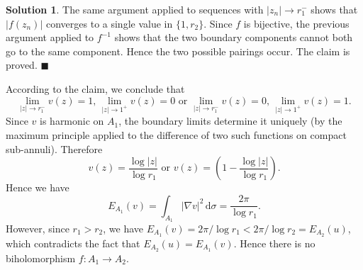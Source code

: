 \documentclass{article}
\theoremstyle{definition}
\newtheorem{solution}{Solution}
\newcommand{\dd}{\mathrm{d}}
\begin{document}
\begin{solution}
The same argument applied to sequences with $|z_n|\to r_1^-$ shows that $|f(z_n)|$ converges to a single value in $\{1,r_2\}$. Since $f$ is bijective, the previous argument applied to $f^{-1}$ shows that the two boundary components cannot both go to the same component. Hence the two possible pairings occur. The claim is proved. $\blacksquare$
    
    According to the claim, we conclude that 
    \[ \lim_{|z|\to r_1^-}v(z)=1,\,\lim_{|z|\to 1^+}v(z)=0 \text{ or } \lim_{|z|\to r_1^-}v(z)=0,\,\lim_{|z|\to 1^+}v(z)=1.\]
    Since $v$ is harmonic on $A_1$, the boundary limits determine it uniquely (by the maximum principle applied to the difference of two such functions on compact sub-annuli). Therefore
    \[v(z)=\frac{\log |z|}{\log r_1}\text{ or }v(z)=\left(1-\frac{\log |z|}{\log r_1}\right).\]
    Hence we have
    \[E_{A_1}(v)=\int_{A_1}|\nabla v|^2 \, \dd\sigma=\frac{2\pi}{\log r_1}.\]
    However, since $r_1>r_2$, we have $E_{A_1}(v)=2\pi/\log r_1<{2\pi}/{\log r_2}=E_{A_2}(u)$, which contradicts the fact that $E_{A_2}(u)=E_{A_1}(v)$. Hence there is no biholomorphism $f\colon A_1\to A_2$. \qedsymbol
\end{solution}
\end{document}
